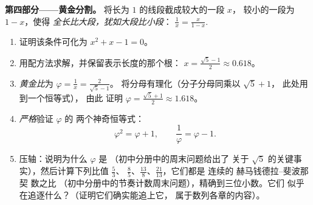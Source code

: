 \begin{problem}[{周末问题——和积问题，
以花拉子米的作图方式配方，以及
方程 $x^2 = x + 1$}]
\medskip
\noindent\textbf{第四部分——黄金分割。}
将长为 $1$ 的线段截成较大的一段 $x$，
较小的一段为 $1 - x$，使得
\emph{全长比大段，犹如大段比小段}：
$\frac{1}{x} = \frac{x}{1 - x}$.
\begin{enumerate}[resume]
  \item 证明该条件可化为 $x^2 + x - 1 = 0$。
  \item 用配方法求解，并保留表示长度的那个根：
        $x = \frac{\sqrt5 - 1}{2} \approx 0.618$。
  \item \emph{黄金比}为 $\varphi = \frac1x = \frac{2}{\sqrt5 - 1}$。
        将分母有理化（分子分母同乘以 $\sqrt5 + 1$，
        此处用到一个恒等式），
        由此
        证明 $\varphi = \frac{\sqrt5 + 1}{2} \approx 1.618$。
  \item \emph{严格}验证 $\varphi$ 的
        两个神奇恒等式：
        \[
        \varphi^2 = \varphi + 1,
        \qquad
        \frac{1}{\varphi} = \varphi - 1 .
        \]
  \item 压轴：说明为什么 $\varphi$ 是
        （初中分册中的周末问题给出了
        关于 $\sqrt5$ 的关键事实），然后计算下列比值 $\frac53$、
        $\frac85$、$\frac{13}{8}$、$\frac{21}{13}$，它们都是
        连续的 赫马钱德拉–斐波那契 数之比
        （初中分册中的节奏计数周末问题），精确到三位小数。它们
        似乎在追逐什么？（证明它们确实能追上它，
        属于数列各章的内容）。
\end{enumerate}
\end{problem}
